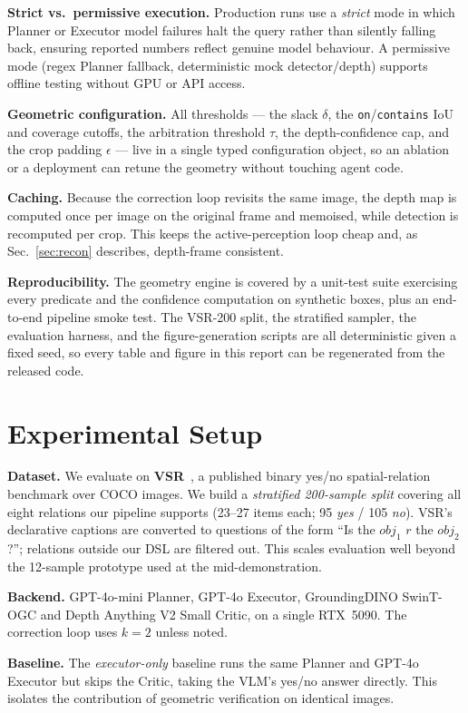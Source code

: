 \documentclass[10pt,twocolumn,letterpaper]{article}
\newcommand{\obj}[1]{\textit{#1}}
\newcommand{\rel}[1]{\texttt{#1}}
\begin{document}
\textbf{Strict vs.\ permissive execution.} Production runs use a
\emph{strict} mode in which Planner or Executor model failures halt the query
rather than silently falling back, ensuring reported numbers reflect genuine
model behaviour. A permissive mode (regex Planner fallback, deterministic mock
detector/depth) supports offline testing without GPU or API access.

\textbf{Geometric configuration.} All thresholds --- the slack $\delta$, the
\rel{on}/\rel{contains} IoU and coverage cutoffs, the arbitration threshold
$\tau$, the depth-confidence cap, and the crop padding $\epsilon$ --- live in a
single typed configuration object, so an ablation or a deployment can retune
the geometry without touching agent code.

\textbf{Caching.} Because the correction loop revisits the same image, the
depth map is computed once per image on the original frame and memoised, while
detection is recomputed per crop. This keeps the active-perception loop cheap
and, as Sec.~\ref{sec:recon} describes, depth-frame consistent.

\textbf{Reproducibility.} The geometry engine is covered by a unit-test suite
exercising every predicate and the confidence computation on synthetic boxes,
plus an end-to-end pipeline smoke test. The VSR-200 split, the stratified
sampler, the evaluation harness, and the figure-generation scripts are all
deterministic given a fixed seed, so every table and figure in this report can
be regenerated from the released code.

\section{Experimental Setup}
\textbf{Dataset.} We evaluate on \textbf{VSR}~\cite{vsr}, a published binary
yes/no spatial-relation benchmark over COCO images. We build a
\emph{stratified 200-sample split} covering all eight relations our pipeline
supports (23--27 items each; 95 \emph{yes} / 105 \emph{no}). VSR's declarative
captions are converted to questions of the form ``Is the $\obj{obj}_1$ $r$ the
$\obj{obj}_2$?''; relations outside our DSL are filtered out. This scales
evaluation well beyond the 12-sample prototype used at the
mid-demonstration.

\textbf{Backend.} GPT-4o-mini Planner, GPT-4o Executor, GroundingDINO
SwinT-OGC and Depth Anything V2 Small Critic, on a single RTX~5090. The
correction loop uses $k=2$ unless noted.

\textbf{Baseline.} The \emph{executor-only} baseline runs the same Planner and
GPT-4o Executor but skips the Critic, taking the VLM's yes/no answer directly.
This isolates the contribution of geometric verification on identical images.
\end{document}
